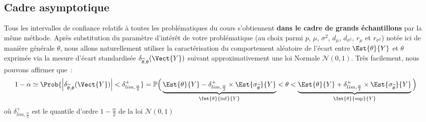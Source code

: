 \documentclass[10pt]{article}
\begin{document}
\subsection{Cadre asymptotique}
Tous les intervalles de confiance relatifs {\`a} toutes les probl{\'e}matiques du cours s'obtiennent \textbf{dans le cadre de grands {\'e}chantillons} par la m{\^e}me m{\'e}thode. 
Apr{\`e}s substitution du param{\`e}tre d'int{\'e}r{\^e}t de votre probl{\'e}matique (au choix parmi $p$, $\mu$, $\sigma^2$, $d_\mu$, $d_{\sigma^2}$, $r_{\mu}$ et $r_{\sigma^2}$)
 not{\'e}e ici de mani{\`e}re g{\'e}n{\'e}rale $\theta$, nous allons naturellement utiliser la caract{\'e}risation du comportement al{\'e}atoire de l'{\'e}cart entre $\Est{\theta}{Y}$ 
et $\theta$ exprim{\'e}e via la mesure d'{\'e}cart standardis{\'e}e $\delta_{\widehat{\theta},\theta}(\Vect{Y})$ suivant approximativement une loi Normale  $\mathcal{N}(0,1)$. 
Tr{\`e}s facilement, nous pouvons affirmer que~:
\[
1-\alpha\simeq\Prob{\left|\delta_{\widehat{\theta},\theta}(\Vect{Y}) \right|<\delta^+_{lim,\frac{\alpha}2}}=\mathbb{P} \Big( 
\underbrace{\Est{\theta}{Y}-\delta^+_{lim,\frac{\alpha}2}\times 
\Est{\sigma_{\widehat{\theta}}}{Y}}_{\Int{\theta}{\inf}{Y}}<\theta<\underbrace{\Est{\theta}{Y}+\delta_{lim,\frac{\alpha}2}^+\times 
\Est{\sigma_{\widehat{\theta}}}{Y}}_{\Int{\theta}{\sup}{Y}} \Big)
\]
o{\`u} $\delta^+_{lim,\frac{\alpha}2}$ est le quantile d'ordre 
$1-\frac{\alpha}2$ de la loi $\mathcal{N}(0,1)$
\end{document}

